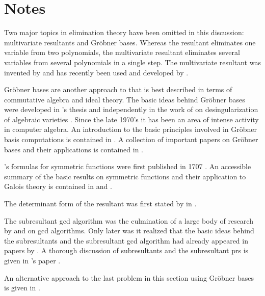 \section*{Notes}

\small

Two major topics in elimination theory have been omitted in this 
discussion: multivariate resultants and 
Gr\"{o}bner bases.  Whereas
the resultant eliminates one variable from two polynomials, the
multivariate resultant eliminates several variables from several
polynomials in a single step.  The multivariate resultant was invented by
{\Macaulay} \cite{Macaulay1902-ez,Macaulay1916-rw,Macaulay1921-gz} and has recently
been used and developed by {\Canny} \cite{Canny1987-sc,Manocha1991-iq,Manocha1993-re}.

Gr\"{o}bner bases are another approach to  that is
best described in terms of commutative algebra and ideal theory.  The
basic ideas behind Gr\"{o}bner bases were developed in
{\Buchberger}'s thesis \cite{Buchberger1970-pa} and independently in the
work of {\Hironaka} on desingularization of algebraic varieties
\cite{Hironaka1964-du}.  Since the late 1970's it has been an area of
intense activity in computer algebra.  An introduction to the basic
principles involved in Gr\"{o}bner basis computations is contained in
\cite{Buchberger1985-sz}.  A collection of important papers on
Gr\"{o}bner bases and their applications is contained in
\cite{Robbiano1989-jx}.

  {\Newton}'s formulas for symmetric
functions were first published in 1707 \cite{Newton1707-yd}.  An accessible
summary of the basic results on symmetric functions and their
application to Galois theory is contained in {\Netto}
\cite{Netto1908-mu} and {\JordanC} \cite{Jordan1870-vz}.

 The determinant form of the resultant
was first stated by {\Sylvester} in \cite{Sylvester1853-vw}.

 The subresultant {\sc gcd} algorithm
was the culmination of a large body of research by {\BrownWS} and
{\Collins} on {\sc gcd} algorithms.  Only later was it realized that the
basic ideas behind the subresultants and the subresultant {\sc gcd}
algorithm had already appeared in papers by {\Habicht}
\cite{Habicht1948-tn,Habicht1948-oi}.   A thorough discussion of subresultants
and the subresultant {\sc prs} is given in {\Loos}'s paper
\cite{Loos1982-up}.

  An alternative approach to the last 
problem in this section using Gr\"{o}bner bases is given in
\cite{Shannon1988-gh}. 

\normalsize


